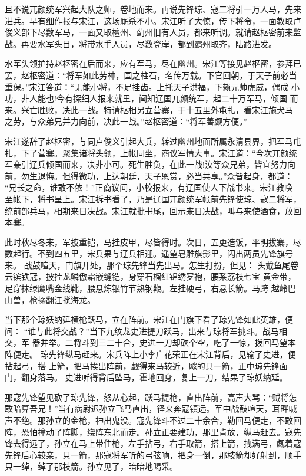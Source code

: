 且不说兀颜统军兴起大队之师，卷地而来。再说先锋琼、寇二将引一万人马，先来
进兵。早有细作报与宋江，这场厮杀不小。宋江听了大惊，传下将令，一面教取卢
俊义部下尽数军马，一面又取檀州、蓟州旧有人员，都来听调。就请赵枢密前来监
战。再要水军头目，将带水手人员，尽数登岸，都到霸州取齐，陆路进发。

水军头领护持赵枢密在后而来，应有军马，尽在幽州。宋江等接见赵枢密，参拜已
罢，赵枢密道：“将军如此劳神，国之柱石，名传万载。下官回朝，于天子前必当
重保。”宋江答道：“无能小将，不足挂齿。上托天子洪福，下赖元帅虎威，偶成
小功，非人能也!今有探细人报来就里，闻知辽国兀颜统军，起二十万军马，倾国
而来。兴亡胜败，决此一战。特请枢相另立营寨，于十五里外屯扎，看宋江施犬马
之劳，与众弟兄并力向前，决此一战。”赵枢密道：“将军善觑方便。”

宋江遂辞了赵枢密，与同卢俊义引起大兵，转过幽州地面所属永清县界，把军马屯
扎，下了营寨。聚集诸将头领，上帐同坐，商议军情大事。宋江道：“今次兀颜统
军亲引辽兵倾国而来，决非小可。死生胜负，在此一战!汝等众兄弟，皆宜努力向
前，勿生退悔。但得微功，上达朝廷，天子恩赏，必当共享。”众皆起身，都道：
“兄长之命，谁敢不依！”正商议间，小校报来，有辽国使人下战书来。宋江教唤
至帐下，将书呈上。宋江拆书看了，乃是辽国兀颜统军帐前先锋使琼、寇二将军，
统前部兵马，相期来日决战。宋江就批书尾，回示来日决战，叫与来使酒食，放回
本寨。

此时秋尽冬来，军披重铠，马挂皮甲，尽皆得时。次日，五更造饭，平明拔寨，尽
数起行。不到四五里，宋兵果与辽兵相迎。遥望皂雕旗影里，闪出两员先锋旗号来。
战鼓喧天，门旗开处，那个琼先锋当先出马。怎生打扮，但见：
头戴鱼尾卷云镔铁冠，披挂龙鳞傲霜嵌缝铠，身穿石榴红锦绣罗袍，腰系荔枝七宝
黄金带，足穿抹绿鹰嘴金线靴，腰悬炼银竹节熟钢鞭。左挂硬弓，右悬长箭。马跨
越岭巴山兽，枪搦翻江搅海龙。

当下那个琼妖纳延横枪跃马，立在阵前。宋江在门旗下看了琼先锋如此英雄，便问：
“谁与此将交战？”当下九纹龙史进提刀跃马，出来与琼将军挑斗。战马相交，军
器并举。二将斗到三二十合，史进一刀却砍个空，吃了一惊，拨回马望本阵便走。
琼先锋纵马赶来。宋兵阵上小李广花荣正在宋江背后，见输了史进，便拈起弓，搭
上箭，把马挨出阵前，觑得来马较近，飕的只一箭，正中琼先锋面门，翻身落马。
史进听得背后坠马，霍地回身，复上一刀，结果了琼妖纳延。

那寇先锋望见砍了琼先锋，怒从心起，跃马提枪，直出阵前，高声大骂：“贼将怎
敢暗算吾兄！”当有病尉迟孙立飞马直出，径来奔寇镇远。军中战鼓喧天，耳畔喊
声不绝。那孙立的金枪，神出鬼没。寇先锋斗不过二十余合，勒回马便走，不敢回
阵，恐怕撞动了阵脚，绕阵东北而走。孙立正要建功，那里肯放，纵马赶去。寇先
锋去得远了，孙立在马上带住枪，左手拈弓，右手取箭，搭上箭，拽满弓，觑着寇
先锋后心较亲，只一箭，那寇将军听的弓弦响，把身一倒，那枝箭却好射到，顺手
只一绰，绰了那枝箭。孙立见了，暗暗地喝采。

